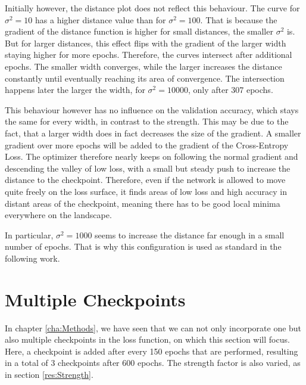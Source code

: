 Initially however, the distance plot does not reflect this behaviour. The curve
for $\sigma^2 = 10$ has a higher distance value than for $\sigma^2 = 100$.
That is because the gradient of the distance function is higher for small
distances, the smaller $\sigma^2$ is. But for larger distances, this effect flips
with the gradient of the larger width staying higher for more epochs. Therefore,
the curves intersect after additional epochs. The smaller width converges, while
the larger increases the distance constantly until eventually reaching its area of convergence.
The intersection happens later the larger the width, for $\sigma^2 = 10000$,
only after 307 epochs.

This behaviour however has no influence on the validation accuracy, which stays
the same for every width, in contrast to the strength. This may be due to the
fact, that a larger width does in fact decreases the size of the gradient. A
smaller gradient over more epochs will be added to the gradient of the
Cross-Entropy Loss. The optimizer therefore nearly keeps on following the normal
gradient and descending the valley of low loss, with a small but steady push to
increase the distance to the checkpoint. Therefore, even if the network is
allowed to move quite freely on the loss surface, it finds areas of low loss and
high accuracy in distant areas of the checkpoint, meaning there has to be good
local minima everywhere on the landscape.

In particular, $\sigma^2 = 1000$ seems to increase the distance far enough in a
small number of epochs. That is why this configuration is used as standard in the
following work.
\pagebreak




\section{Multiple Checkpoints}\label{res:Multiple} 

In chapter \ref{cha:Methods}, we have seen that we can not only incorporate one
but also multiple checkpoints in the loss function, on which this section will
focus. Here, a checkpoint is added after every 150 epochs that are performed,
resulting in a total of 3 checkpoints after 600 epochs. The strength factor is
also varied, as in section \ref{res:Strength}.



